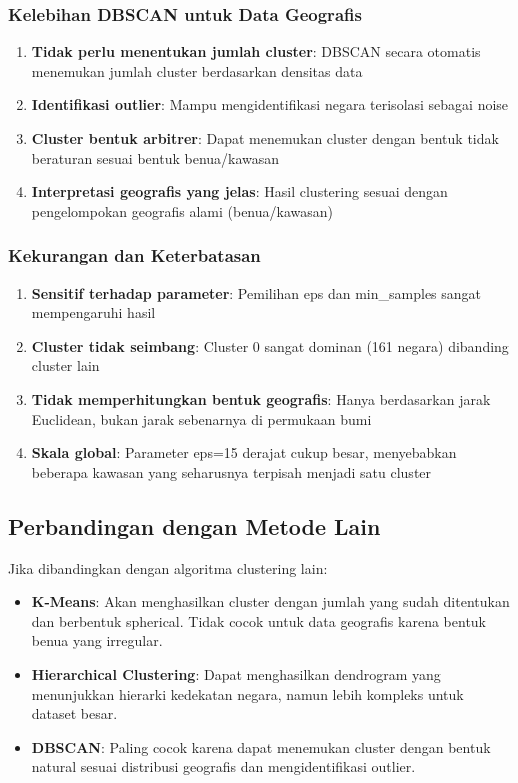 \documentclass[12pt,a4paper]{article}
\begin{document}
\subsubsection{Kelebihan DBSCAN untuk Data Geografis}
\begin{enumerate}
    \item \textbf{Tidak perlu menentukan jumlah cluster}: DBSCAN secara otomatis menemukan jumlah cluster berdasarkan densitas data
    \item \textbf{Identifikasi outlier}: Mampu mengidentifikasi negara terisolasi sebagai noise
    \item \textbf{Cluster bentuk arbitrer}: Dapat menemukan cluster dengan bentuk tidak beraturan sesuai bentuk benua/kawasan
    \item \textbf{Interpretasi geografis yang jelas}: Hasil clustering sesuai dengan pengelompokan geografis alami (benua/kawasan)
\end{enumerate}

\subsubsection{Kekurangan dan Keterbatasan}
\begin{enumerate}
    \item \textbf{Sensitif terhadap parameter}: Pemilihan eps dan min\_samples sangat mempengaruhi hasil
    \item \textbf{Cluster tidak seimbang}: Cluster 0 sangat dominan (161 negara) dibanding cluster lain
    \item \textbf{Tidak memperhitungkan bentuk geografis}: Hanya berdasarkan jarak Euclidean, bukan jarak sebenarnya di permukaan bumi
    \item \textbf{Skala global}: Parameter eps=15 derajat cukup besar, menyebabkan beberapa kawasan yang seharusnya terpisah menjadi satu cluster
\end{enumerate}

\subsection{Perbandingan dengan Metode Lain}

Jika dibandingkan dengan algoritma clustering lain:

\begin{itemize}
    \item \textbf{K-Means}: Akan menghasilkan cluster dengan jumlah yang sudah ditentukan dan berbentuk spherical. Tidak cocok untuk data geografis karena bentuk benua yang irregular.
    
    \item \textbf{Hierarchical Clustering}: Dapat menghasilkan dendrogram yang menunjukkan hierarki kedekatan negara, namun lebih kompleks untuk dataset besar.
    
    \item \textbf{DBSCAN}: Paling cocok karena dapat menemukan cluster dengan bentuk natural sesuai distribusi geografis dan mengidentifikasi outlier.
\end{itemize}
\end{document}
